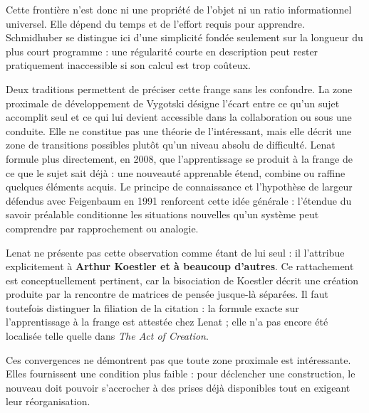 \documentclass[10pt,a4paper]{article}
\begin{document}
Cette frontière n'est donc ni une propriété de l'objet ni un ratio informationnel universel. Elle dépend du temps et de l'effort requis pour apprendre. Schmidhuber se distingue ici d'une simplicité fondée seulement sur la longueur du plus court programme : une régularité courte en description peut rester pratiquement inaccessible si son calcul est trop coûteux.

Deux traditions permettent de préciser cette frange sans les confondre. La zone proximale de développement de Vygotski désigne l'écart entre ce qu'un sujet accomplit seul et ce qui lui devient accessible dans la collaboration ou sous une conduite. Elle ne constitue pas une théorie de l'intéressant, mais elle décrit une zone de transitions possibles plutôt qu'un niveau absolu de difficulté. Lenat formule plus directement, en 2008, que l'apprentissage se produit à la frange de ce que le sujet sait déjà : une nouveauté apprenable étend, combine ou raffine quelques éléments acquis. Le principe de connaissance et l'hypothèse de largeur défendus avec Feigenbaum en 1991 renforcent cette idée générale : l'étendue du savoir préalable conditionne les situations nouvelles qu'un système peut comprendre par rapprochement ou analogie.

Lenat ne présente pas cette observation comme étant de lui seul : il l'attribue explicitement à \textbf{Arthur Koestler et à beaucoup d'autres}. Ce rattachement est conceptuellement pertinent, car la bisociation de Koestler décrit une création produite par la rencontre de matrices de pensée jusque-là séparées. Il faut toutefois distinguer la filiation de la citation : la formule exacte sur l'apprentissage à la frange est attestée chez Lenat ; elle n'a pas encore été localisée telle quelle dans \emph{The Act of Creation}.

Ces convergences ne démontrent pas que toute zone proximale est intéressante. Elles fournissent une condition plus faible : pour déclencher une construction, le nouveau doit pouvoir s'accrocher à des prises déjà disponibles tout en exigeant leur réorganisation.
\end{document}
